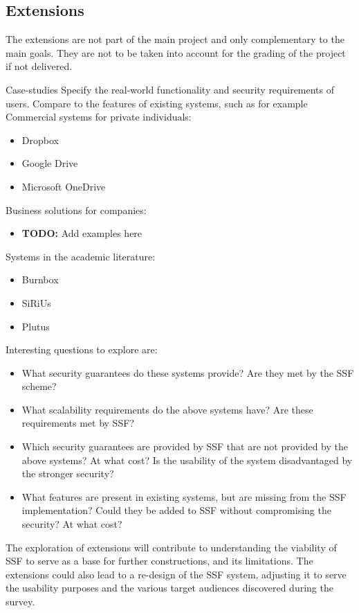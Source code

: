 \documentclass[E]{BAMASA}
\newcommand{\TODO}[1]{{\color{Red}\textbf{TODO:} #1}}
\begin{document}
\subsection{Extensions}
The extensions are not part of the main project and only complementary to the main goals.
They are not to be taken into account for the grading of the project if not delivered. 

\begin{workpackage}{Case-studies}\label{wp:extension}
	Specify the real-world functionality and security requirements of users.
	Compare to the features of existing systems, such as for example\\
	Commercial systems for private individuals:
    \begin{itemize}
        \item Dropbox
        \item Google Drive
        \item Microsoft OneDrive
    \end{itemize}
    Business solutions for companies:
    \begin{itemize}
    	\item \TODO{Add examples here}
    \end{itemize}
    Systems in the academic literature:
    \begin{itemize}
    	\item Burnbox~\cite{USENIX:TMRM18}
    	\item SiRiUs~\cite{NDSS:GSMB03}
    	\item Plutus~\cite{USENIXSAGE:KaRiSwWaFu03}
    \end{itemize}
    Interesting questions to explore are:
    \begin{itemize}
        \item What security guarantees do these systems provide?
        Are they met by the SSF scheme?
        
        \item What scalability requirements do the above systems have? Are these requirements met by SSF?
        
        \item Which security guarantees are provided by SSF that are not provided by the above systems?
        At what cost?
        Is the usability of the system disadvantaged by the stronger security?
        
        \item What features are present in existing systems, but are missing from the SSF implementation?
        Could they be added to SSF without compromising the security?
        At what cost?
    \end{itemize}
    
    The exploration of extensions will contribute to understanding the viability of SSF to serve as a base for further constructions, and its limitations.
    The extensions could also lead to a re-design of the SSF system, adjusting it to serve the usability purposes and the various target audiences discovered during the survey.
\end{workpackage}
\end{document}
